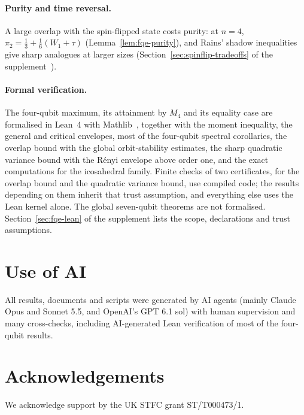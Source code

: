 \documentclass[11pt]{article}
\begin{document}
\paragraph{Purity and time reversal.}\label{rem:fqe-spinflip-tradeoff}
A large overlap with the spin-flipped state costs purity: at $n=4$, $\pi_2=\tfrac13+\tfrac16(W_1+\tau)$
(Lemma~\ref{lem:fqe-purity}), and Rains' shadow inequalities give sharp analogues at larger sizes
(Section~\ref{sec:spinflip-tradeoffs} of the supplement~\cite{Companion}).

\paragraph{Formal verification.} The four-qubit maximum, its attainment by $M_4$ and its equality case are formalised in
Lean~4 with Mathlib~\cite{Companion}, together with the moment inequality, the general and critical envelopes, most of the
four-qubit spectral corollaries, the overlap bound with the global orbit-stability estimates, the sharp quadratic
variance bound with the R\'enyi envelope above order one, and the exact
computations for the icosahedral family. Finite checks of two certificates, for the overlap bound and the quadratic
variance bound, use compiled code; the results depending on them inherit that trust assumption, and everything else uses
the Lean kernel alone. The global seven-qubit theorems are not formalised. Section~\ref{sec:fqe-lean} of the supplement
lists the scope, declarations and trust assumptions.

\section*{Use of AI}
All results, documents and scripts were generated by AI agents (mainly Claude Opus and Sonnet 5.5, and OpenAI's GPT 6.1 sol) with human supervision and many cross-checks,
including AI-generated Lean verification of most of the four-qubit results.

\section*{Acknowledgements}
We acknowledge support by the UK STFC grant ST/T000473/1.

\appendix








\end{document}
